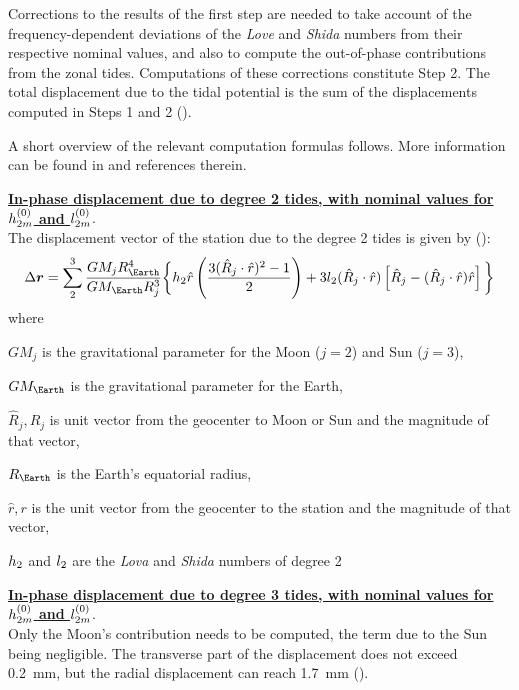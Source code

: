 Corrections to the results of the first step are needed to take account of the 
frequency-dependent deviations of the \emph{Love} and \emph{Shida} numbers from 
their respective nominal values, and also to compute the out-of-phase 
contributions from the zonal tides. Computations of these corrections constitute 
Step 2. The total displacement due to the tidal potential is the sum of the 
displacements computed in Steps 1 and 2 (\cite{IERS2010}).

A short overview of the relevant computation formulas follows. More information 
can be found in \cite{iers2010} and references therein.

\textbf{\ul{In-phase displacement due to degree 2 tides, with nominal values for 
$h ^{(0)}_{2m}$ and $l ^{(0)}_{2m}$}}.\\
The displacement vector of the station due to the degree 2 tides is given by 
(\cite{iers2010}):
\begin{equation}
  \Delta \bm{r} = \sum ^{3}_{2} \frac{GM_j R^4_{\Earth}}{GM_{\Earth}R^3_j}
    \biggl\{ \loveh _2 \hat{r} \left( \frac{3 (\hat{R}_j \cdot \hat{r})^2 -1}{2} \right) 
      + 3 \lovel _2 (\hat{R}_j \cdot \hat{r}) \left[ \hat{R}_j - (\hat{R}_j \cdot \hat{r}) \hat{r} \right] 
    \biggl\}
    \label{eq:iers105}
\end{equation}
where \begin{description}
  \item $GM_j$ is the gravitational parameter for the Moon ($j=2$) and Sun ($j=3$),
  \item $GM_{\Earth}$ is the gravitational parameter for the Earth,
  \item $\hat{R}_j, R_j$ is unit vector from the geocenter to Moon or Sun and 
    the magnitude of that vector,
  \item $R_{\Earth}$ is the Earth’s equatorial radius,
  \item $\hat{r}, r$ is the unit vector from the geocenter to the station and 
    the magnitude of that vector,
  \item $h _2$ and $l _2$ are the \emph{Lova} and \emph{Shida} numbers 
    of degree 2
\end{description}

\textbf{\ul{In-phase displacement due to degree 3 tides, with nominal values for
$h ^{(0)}_{2m}$ and $l ^{(0)}_{2m}$}}.\\

Only the Moon’s contribution needs to be computed, the term due to the Sun being
negligible. The transverse part of the displacement does not exceed \SI{0.2}{\mm}, 
but the radial displacement can reach \SI{1.7}{\mm} (\cite{iers2010}).

